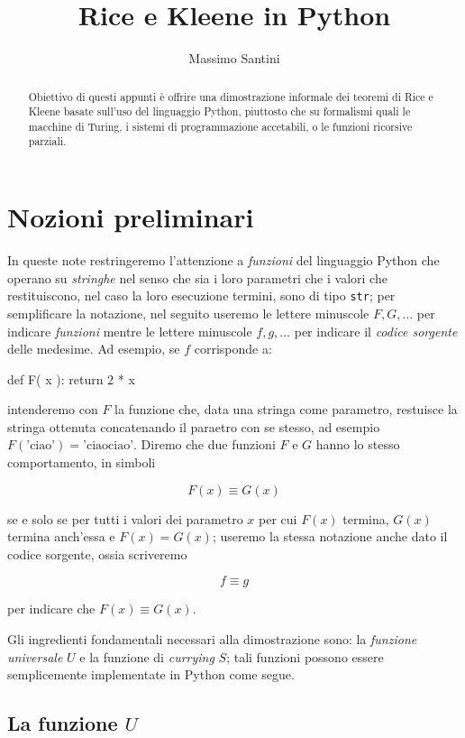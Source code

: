 \documentclass[a4paper]{article}
\title{Rice e Kleene in Python}
\author{Massimo Santini} %
\begin{document}
\maketitle

\begin{abstract}
Obiettivo di questi appunti è offrire una dimostrazione informale dei teoremi
di Rice e Kleene basate sull'uso del linguaggio Python, piuttosto che su
formalismi quali le macchine di Turing, i sistemi di programmazione accetabili,
o le funzioni ricorsive parziali.
\end{abstract}

\section*{Nozioni preliminari}

In queste note restringeremo l'attenzione a \emph{funzioni} del linguaggio
Python che operano su \emph{stringhe} nel senso che sia i loro parametri che i
valori che restituiscono, nel caso la loro esecuzione termini, sono di tipo
\verb|str|; per semplificare la notazione, nel seguito useremo le lettere
minuscole $F, G, \ldots$ per indicare \emph{funzioni} mentre le lettere
minuscole $f, g, \ldots$ per indicare il \emph{codice sorgente} delle
medesime. Ad esempio, se $f$ corrisponde a:

\begin{pycode}
def F( x ):
	return 2 * x
\end{pycode}

intenderemo con $F$ la funzione che, data una stringa come parametro,
restuisce la stringa ottenuta concatenando il paraetro con se stesso, ad
esempio $F(\text{'ciao'})=\text{'ciaociao'}$. Diremo che due funzioni $F$ e
$G$ hanno lo stesso comportamento, in simboli

\[
	F( x ) \equiv G( x )
\]

se e solo se per tutti i valori dei parametro $x$ per cui $F(x)$ termina,
$G(x)$ termina anch'essa e $F(x)=G(x)$; useremo la stessa notazione anche dato
il codice sorgente, ossia scriveremo

\[
  f \equiv g
\]

per indicare che $F( x ) \equiv G( x )$.

Gli ingredienti fondamentali necessari alla dimostrazione sono: la
\emph{funzione universale} $U$ e la funzione di \emph{currying} $S$; tali
funzioni possono essere semplicemente implementate in Python come segue.

\subsection*{La funzione $U$}
\end{document}
